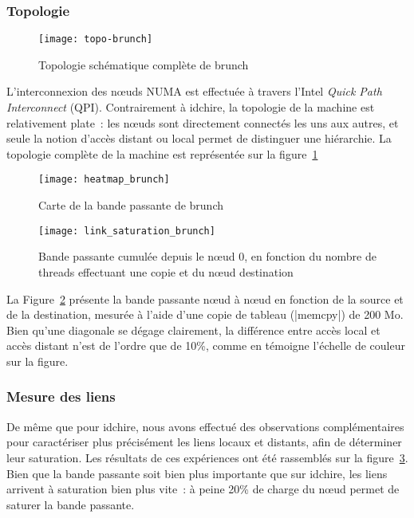 \subsubsection{Topologie}

\begin{figure}[ht]
  \centering
  \texttt{[image: topo-brunch]}
  \caption{Topologie schématique complète de brunch}\label{fig:contribs:machines:brunch:topo-liens}
\end{figure}

L'interconnexion des nœuds NUMA est effectuée à travers l'Intel \emph{Quick Path Interconnect} (QPI).
Contrairement à idchire, la topologie de la machine est relativement plate~: les nœuds sont directement connectés les uns aux autres, et seule la notion d'accès distant ou local permet de distinguer une hiérarchie.
La topologie complète de la machine est représentée sur la figure~\ref{fig:contribs:machines:brunch:topo-liens}

\begin{figure}[t!]
  \centering
  \texttt{[image: heatmap\_brunch]}
  \caption{Carte de la bande passante de brunch}\label{fig:contribs:machines:brunch:heatmap}
\end{figure}
\begin{figure}[h!]
  \centering
  \texttt{[image: link\_saturation\_brunch]}
  \caption{Bande passante cumulée depuis le nœud 0, en fonction du nombre de threads effectuant une copie et du nœud destination}\label{fig:contribs:machines:brunch:saturation}
\end{figure}


La Figure~\ref{fig:contribs:machines:brunch:heatmap} présente la bande passante nœud à nœud en fonction de la source et de la destination, mesurée à l'aide d'une copie de tableau (|memcpy|) de 200 Mo.
Bien qu'une diagonale se dégage clairement, la différence entre accès local et accès distant n'est de l'ordre que de 10\%, comme en témoigne l'échelle de couleur sur la figure.

\subsubsection{Mesure des liens}

De même que pour idchire, nous avons effectué des observations complémentaires pour caractériser plus précisément les liens locaux et distants, afin de déterminer leur saturation.
Les résultats de ces expériences ont été rassemblés sur la figure~\ref{fig:contribs:machines:brunch:saturation}.
Bien que la bande passante soit bien plus importante que sur idchire, les liens arrivent à saturation bien plus vite~: à peine 20\% de charge du nœud permet de saturer la bande passante.

